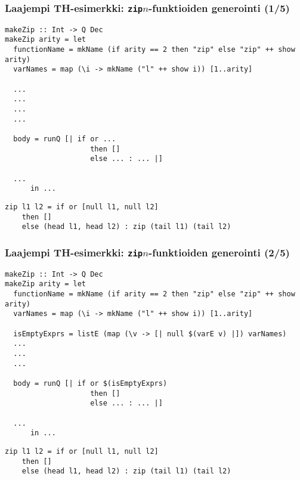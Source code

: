 \documentclass{beamer}
\begin{document}
\begin{frame}[fragile]
\frametitle{Laajempi TH-esimerkki: \texttt{zip$n$}-funktioiden generointi (1/5)}
\footnotesize
\begin{verbatim}
makeZip :: Int -> Q Dec
makeZip arity = let
  functionName = mkName (if arity == 2 then "zip" else "zip" ++ show arity)
  varNames = map (\i -> mkName ("l" ++ show i)) [1..arity]

  ...
  ...
  ...
  ...

  body = runQ [| if or ...
                    then []
                    else ... : ... |]

  ...
      in ...
\end{verbatim}
\noindent\makebox[\linewidth]{\rule{\paperwidth}{0.4pt}}
\begin{verbatim}
zip l1 l2 = if or [null l1, null l2]
    then []
    else (head l1, head l2) : zip (tail l1) (tail l2)
\end{verbatim}
\end{frame}

\begin{frame}[fragile]
\frametitle{Laajempi TH-esimerkki: \texttt{zip$n$}-funktioiden generointi (2/5)}
\footnotesize
\begin{verbatim}
makeZip :: Int -> Q Dec
makeZip arity = let
  functionName = mkName (if arity == 2 then "zip" else "zip" ++ show arity)
  varNames = map (\i -> mkName ("l" ++ show i)) [1..arity]

  isEmptyExprs = listE (map (\v -> [| null $(varE v) |]) varNames)
  ...
  ...
  ...

  body = runQ [| if or $(isEmptyExprs)
                    then []
                    else ... : ... |]

  ...
      in ...
\end{verbatim}
\noindent\makebox[\linewidth]{\rule{\paperwidth}{0.4pt}}
\begin{verbatim}
zip l1 l2 = if or [null l1, null l2]
    then []
    else (head l1, head l2) : zip (tail l1) (tail l2)
\end{verbatim}
\end{frame}
\end{document}
